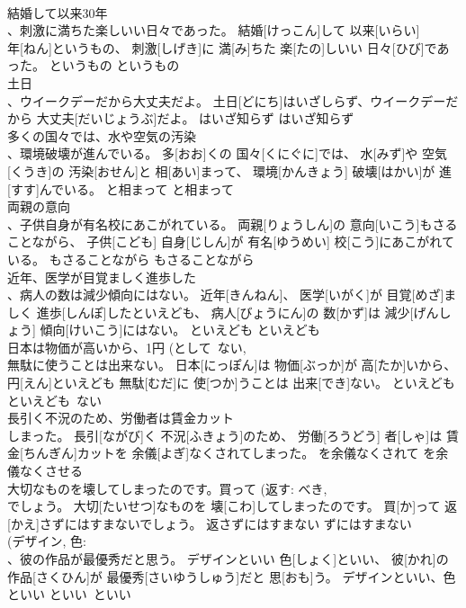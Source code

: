 \documentclass[8pt]{extreport}
\begin{document}
\begin{CJK}{UTF8}{min}
\\	結婚して以来30年 
\\	、刺激に満ちた楽しいい日々であった。	結婚[けっこん]して 以来[いらい] 
\\	年[ねん]というもの、 刺激[しげき]に 満[み]ちた 楽[たの]しいい 日々[ひび]であった。	というもの	というもの	
\\	土日 
\\	、ウイークデーだから大丈夫だよ。	土日[どにち]はいざしらず、ウイークデーだから 大丈夫[だいじょうぶ]だよ。	はいざ知らず	はいざ知らず	
\\	多くの国々では、水や空気の汚染 
\\	、環境破壊が進んでいる。	多[おお]くの 国々[くにぐに]では、 水[みず]や 空気[くうき]の 汚染[おせん]と 相[あい]まって、 環境[かんきょう] 破壊[はかい]が 進[すす]んでいる。	と相まって	と相まって	
\\	両親の意向 
\\	、子供自身が有名校にあこがれている。	両親[りょうしん]の 意向[いこう]もさることながら、 子供[こども] 自身[じしん]が 有名[ゆうめい] 校[こう]にあこがれている。	もさることながら	もさることながら	
\\	近年、医学が目覚ましく進歩した 
\\	、病人の数は減少傾向にはない。	近年[きんねん]、 医学[いがく]が 目覚[めざ]ましく 進歩[しんぽ]したといえども、 病人[びょうにん]の 数[かず]は 減少[げんしょう] 傾向[けいこう]にはない。	といえども	といえども	
\\	日本は物価が高いから、1円 (として~ない, 
\\	無駄に使うことは出来ない。	日本[にっぽん]は 物価[ぶっか]が 高[たか]いから、 
\\	円[えん]といえども 無駄[むだ]に 使[つか]うことは 出来[でき]ない。	といえども	といえども~ない	
\\	長引く不況のため、労働者は賃金カット 
\\	しまった。	長引[ながび]く 不況[ふきょう]のため、 労働[ろうどう] 者[しゃ]は 賃金[ちんぎん]カットを 余儀[よぎ]なくされてしまった。	を余儀なくされて	を余儀なくさせる	
\\	大切なものを壊してしまったのです。買って (返す: べき, 
\\	でしょう。	大切[たいせつ]なものを 壊[こわ]してしまったのです。 買[か]って 返[かえ]さずにはすまないでしょう。	返さずにはすまない	ずにはすまない	
\\	(デザイン, 色: 
\\	、彼の作品が最優秀だと思う。	デザインといい 色[しょく]といい、 彼[かれ]の 作品[さくひん]が 最優秀[さいゆうしゅう]だと 思[おも]う。	デザインといい、色といい	といい~といい	

\end{CJK}
\end{document}
